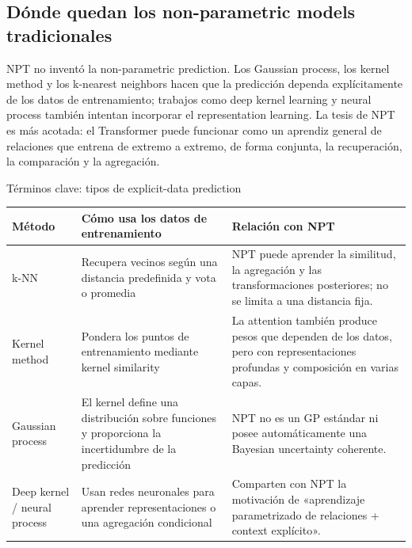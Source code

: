 \subsection{Dónde quedan los non-parametric models tradicionales}

NPT no inventó la non-parametric prediction. Los Gaussian process, los kernel method y los k-nearest neighbors hacen que la predicción dependa explícitamente de los datos de entrenamiento; trabajos como deep kernel learning y neural process también intentan incorporar el representation learning. La tesis de NPT es más acotada: el Transformer puede funcionar como un aprendiz general de relaciones que entrena de extremo a extremo, de forma conjunta, la recuperación, la comparación y la agregación.


\begin{knowledgebox}{Términos clave: tipos de explicit-data prediction}
\begin{tabularx}{\textwidth}{L{0.20\textwidth}L{0.27\textwidth}X}
\toprule
Método & Cómo usa los datos de entrenamiento & Relación con NPT \\
\midrule
k-NN & Recupera vecinos según una distancia predefinida y vota o promedia & NPT puede aprender la similitud, la agregación y las transformaciones posteriores; no se limita a una distancia fija. \\
Kernel method & Pondera los puntos de entrenamiento mediante kernel similarity & La attention también produce pesos que dependen de los datos, pero con representaciones profundas y composición en varias capas. \\
Gaussian process & El kernel define una distribución sobre funciones y proporciona la incertidumbre de la predicción & NPT no es un GP estándar ni posee automáticamente una Bayesian uncertainty coherente. \\
Deep kernel / neural process & Usan redes neuronales para aprender representaciones o una agregación condicional & Comparten con NPT la motivación de «aprendizaje parametrizado de relaciones + context explícito». \\
\bottomrule
\end{tabularx}
\end{knowledgebox}


